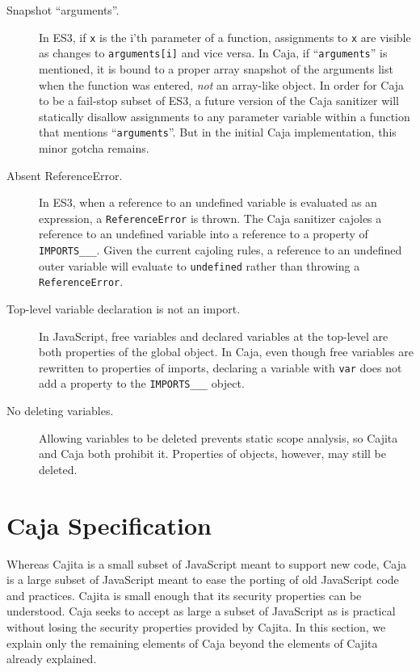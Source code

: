 \documentclass[letterpaper,twocolumn,10pt]{article}
\newcommand{\code}[1]{{\tt {#1}}}              %
\begin{document}
\begin{description}

  \item[Snapshot ``arguments''.] In ES3, if \code{x} is the i'th parameter of 
  a function, assignments to \code{x} are visible as changes to 
  \code{arguments[i]} and vice versa. In Caja, if ``\code{arguments}'' is mentioned, it is 
  bound to a proper array snapshot of the arguments list when the function 
  was entered, \emph{not} an array-like object. In order for Caja to be a 
  fail-stop subset of ES3, a future version of the Caja sanitizer will 
  statically disallow assignments to any parameter variable within a function 
  that mentions ``\code{arguments}''. But in the initial Caja implementation, 
  this minor gotcha remains.
  
  \item[Absent ReferenceError.] In ES3, when a reference to an undefined 
  variable is evaluated as an expression, a \code{ReferenceError} is thrown. 
  The Caja sanitizer cajoles a reference to an undefined variable into a 
  reference to a property of \code{IMPORTS\_\_\_}. Given the current cajoling rules, a 
  reference to an undefined outer variable will evaluate to \code{undefined} 
  rather than throwing a \code{ReferenceError}. 
  
  \item[Top-level variable declaration is not an import.]  In JavaScript,
  free variables and declared variables at the top-level are both properties
  of the global object.  In Caja, even though free variables are rewritten 
  to properties of imports, declaring a variable with \code{var} does not 
  add a property to the \code{IMPORTS\_\_\_} object.
    
  \item[No deleting variables.]  Allowing variables to be deleted prevents
  static scope analysis, so Cajita and Caja both prohibit it.  Properties 
  of objects, however, may still be deleted.
\end{description}

\section{Caja Specification}
\label{sec:caja-spec}

Whereas Cajita is a small subset of JavaScript meant to support new code, 
Caja is a large subset of JavaScript meant to ease the porting of old 
JavaScript code and practices. Cajita is small enough that its security 
properties can be understood. Caja seeks to accept as large a subset of 
JavaScript as is practical without losing the security properties provided by 
Cajita. In this section, we explain only the remaining elements of Caja 
beyond the elements of Cajita already explained.
\end{document}
